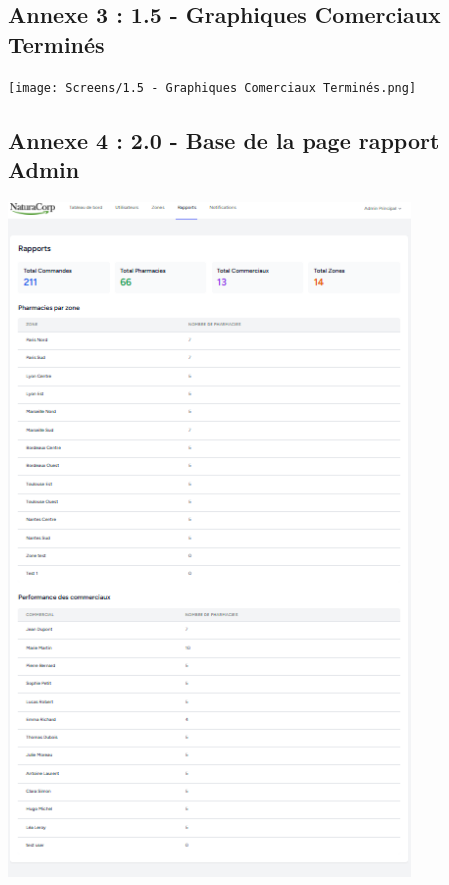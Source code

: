 \documentclass[a4paper,12pt]{report}
\begin{document}
\subsection*{Annexe 3 : 1.5 - Graphiques Comerciaux Terminés}
\vspace{0.5cm}
\texttt{[image: Screens/1.5 - Graphiques Comerciaux Terminés.png]}
\vspace{1cm}

\subsection*{Annexe 4 : 2.0 - Base de la page rapport Admin}
\vspace{0.5cm}
\includegraphics[width=0.8\textwidth]{Screens/2.0 - Base de la page rapport Admin.png}
\vspace{1cm}
\end{document}
